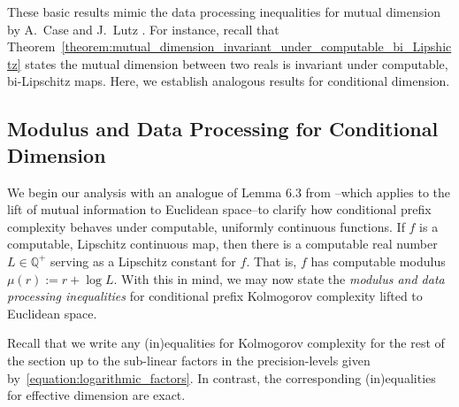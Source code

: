 These basic results mimic the data processing inequalities for mutual dimension by A.~Case and J.~Lutz \cite{CL14}. For instance, recall that Theorem~\ref{theorem:mutual_dimension_invariant_under_computable_bi_Lipshictz} states the mutual dimension between two reals is invariant under computable, bi-Lipschitz maps. Here, we establish analogous results for conditional dimension.

\subsection{Modulus and Data Processing for Conditional Dimension}

We begin our analysis with an analogue of Lemma 6.3 from \cite{CL14}--which applies to the lift of mutual information to Euclidean space--to clarify how conditional prefix complexity behaves under computable, uniformly continuous functions. If $f$ is a computable, Lipschitz continuous map, then there is a computable real number $L \in \mathbb{Q}^+$ serving as a Lipschitz constant for $f$. That is, $f$ has computable modulus $\mu(r) := r + \log L$. With this in mind, we may now state the \textit{modulus and data processing inequalities} for conditional prefix Kolmogorov complexity lifted to Euclidean space.

Recall that we write any (in)equalities for Kolmogorov complexity for the rest of the section up to the sub-linear factors in the precision-levels given by~\eqref{equation:logarithmic_factors}. In contrast, the corresponding (in)equalities for effective dimension are exact.

